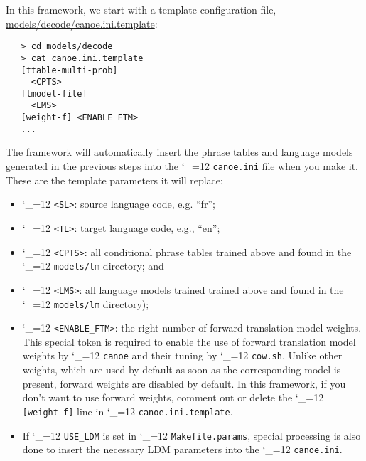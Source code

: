 \documentclass[11pt,letterpaper]{article}
\def\code{\begingroup\catcode`\_=12 \codex}
\newcommand{\codex}[1]{\texttt{#1}\endgroup}
\begin{document}
In this framework, we start with a template configuration file,
\url{models/decode/canoe.ini.template}:
\begin{small}
\begin{verbatim}
   > cd models/decode
   > cat canoe.ini.template
   [ttable-multi-prob]
     <CPTS>
   [lmodel-file]
     <LMS>
   [weight-f] <ENABLE_FTM>
   ...
\end{verbatim}
\end{small}

The framework will automatically insert the phrase tables and language models
generated in the previous steps into the \code{canoe.ini} file when you
make it.  These are the template parameters it will replace:
\begin{itemize}
\item \code{<SL>}:   source language code, e.g. ``fr'';
\item \code{<TL>}:   target language code, e.g., ``en'';
\item \code{<CPTS>}: all conditional phrase tables trained above and found
                       in the \code{models/tm} directory; and
\item \code{<LMS>}:  all language models trained trained above and found in
                       the \code{models/lm} directory);
\item \code{<ENABLE\_FTM>}: the right number of forward translation
model weights.  This special token is required to enable the use of forward
translation model weights by \code{canoe} and their tuning by
\code{cow.sh}.  Unlike other weights, which are used by default as soon as
the corresponding model is present, forward weights are disabled by default.
In this framework, if you don't want to use forward weights, comment out or
delete the \code{[weight-f]} line in \code{canoe.ini.template}.
\item If \code{USE_LDM} is set in \code{Makefile.params}, special
processing is also done to insert the necessary LDM parameters into the
\code{canoe.ini}.
\end{itemize}
\end{document}
